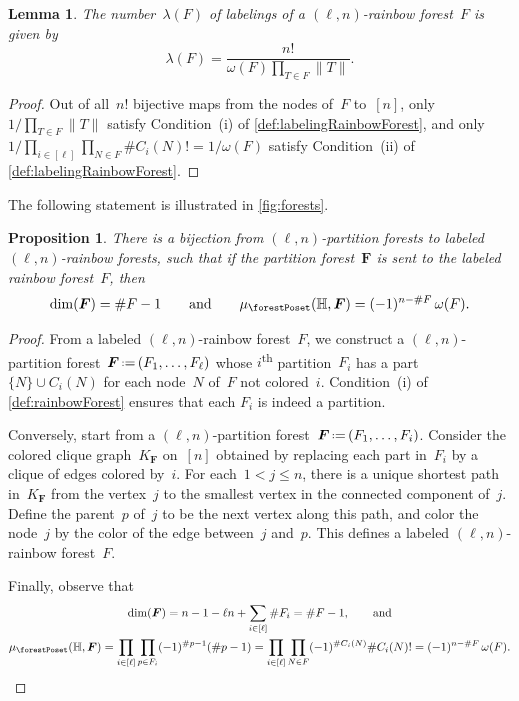 \documentclass{amsart}
\newtheorem{proposition}[theorem]{Proposition}
\newtheorem{lemma}[theorem]{Lemma}
\theoremstyle{definition}
\renewcommand{\b}[1]{{\boldsymbol{#1}}} %
\newcommand{\eqdef}{\mbox{\,\raisebox{0.2ex}{\scriptsize\ensuremath{\mathrm:}}\ensuremath{=}\,}} %
\newcommand{\card}[1]{\##1} %
\newcommand{\ordinal}{\textsuperscript{th}} %
\renewcommand{\b}[1]{\boldsymbol{#1}} %
\newcommand{\HH}{\mathbb{H}} %
\begin{document}
\begin{lemma}
\label{lem:labelingRainbowForest}
The number~$\lambda(F)$ of labelings of a $(\ell,n)$-rainbow forest~$F$ is given by
\[
\lambda(F) = \frac{n!}{\omega(F) \prod\limits_{T \in F} \|T\|} .
\]
\end{lemma}

\begin{proof}
Out of all~$n!$ bijective maps from the nodes of~$F$ to~$[n]$, only~$1/\prod_{T \in F} \|T\|$ satisfy Condition~(i) of \cref{def:labelingRainbowForest}, and only $1/\prod_{i \in [\ell]} \prod_{N \in F} \card{C_i(N)}! = 1/\omega(F)$ satisfy Condition~(ii) of \cref{def:labelingRainbowForest}.
\end{proof}

The following statement is illustrated in \cref{fig:forests}.

\begin{proposition}
\label{prop:bijectionForests}
There is a bijection from $(\ell,n)$-partition forests to labeled $(\ell,n)$-rainbow forests, such that if the partition forest~$\b{F}$ is sent to the labeled rainbow forest~$F$, then
\[
\dim(\b{F}) = \card{F}-1
\qquad\text{and}\qquad
\mu_{\forestPoset}(\HH, \b{F}) = (-1)^{n-\card{F}} \, \omega(F).
\]
\end{proposition}

\begin{proof}
From a labeled $(\ell,n)$-rainbow forest~$F$, we construct a $(\ell,n)$-partition forest~$\b{F} \eqdef (F_1, \dots, F_\ell)$ whose $i$\ordinal{} partition~$F_i$ has a part~$\{N\} \cup C_i(N)$ for each node~$N$ of~$F$ not colored~$i$.
Condition~(i) of \cref{def:rainbowForest} ensures that each $F_i$ is indeed a partition.

Conversely, start from a $(\ell,n)$-partition forest~$\b{F} \eqdef (F_1, \dots, F_i)$.
Consider the colored clique graph~$K_{\b{F}}$ on~$[n]$ obtained by replacing each part in~$F_i$ by a clique of edges colored by~$i$.
For each~$1 < j \le n$, there is a unique shortest path in~$K_{\b{F}}$ from the vertex~$j$ to the smallest vertex in the connected component of~$j$.
Define the parent~$p$ of~$j$ to be the next vertex along this path, and color the node~$j$ by the color of the edge between~$j$ and~$p$.
This defines a labeled $(\ell,n)$-rainbow forest~$F$.

Finally, observe that
\begin{gather*}
\dim(\b{F}) = n - 1 - \ell n + \sum_{i \in [\ell]} \card{F_i} = \card{F}-1, \qquad\text{and} \\
\mu_{\forestPoset}(\HH, \b{F}) = \prod\limits_{i \in [\ell]} \prod\limits_{p \in F_i} (-1)^{\card{p}-1} (\card{p}-1) = \prod\limits_{i \in [\ell]} \prod\limits_{N \in F} (-1)^{\card{C_i(N)}} \card{C_i(N)}! = (-1)^{n-\card{F}} \, \omega(F).
\qedhere
\end{gather*}
\end{proof}
\end{document}
